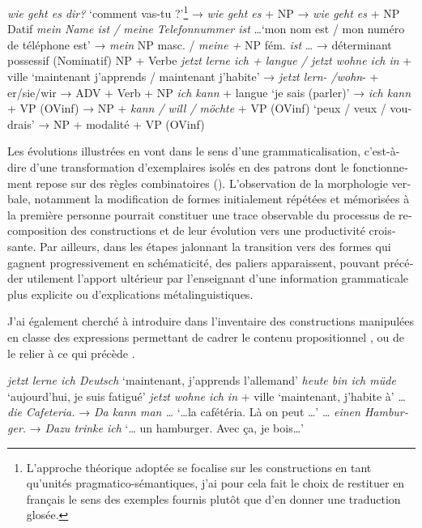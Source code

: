 \documentclass[output=paper]{langscibook}
\begin{document}
\begin{otherlanguage}{french}
\ea \label{ex:felce:1} 
     \ea \textit{wie geht es dir?} `comment vas-tu ?'\footnote{L’approche théorique adoptée se focalise sur les constructions en tant qu’unités pragmatico-sémantiques, j'ai pour cela fait le choix de restituer en français le sens des exemples fournis plutôt que d’en donner une traduction glosée.} → \textit{wie geht es} + NP → \textit{wie geht es} + NP Datif
     \ex \textit{mein Name ist / meine Telefonnummer ist} …`mon nom est / mon numéro de téléphone est' → \textit{mein} NP masc. / \textit{meine +} NP fém. \textit{ist} … →   déterminant possessif (Nominatif) NP + Verbe
     \ex \textit{jetzt lerne ich + langue / jetzt wohne ich in} + ville `maintenant j’apprends / maintenant j’habite' → \textit{jetzt lern- /wohn}- + er/sie/wir → ADV + Verb + NP
     \ex \textit{ich kann} + langue `je sais (parler)' → \textit{ich kann} + VP (OVinf) → NP + \textit{kann / will / möchte} + VP (OVinf) `peux / veux / voudrais' → NP + modalité + VP (OVinf)
     \z
\z

Les évolutions illustrées en  vont dans le sens d’une grammaticalisation, c’est-à-dire d’une transformation d’exemplaires isolés en des patrons dont le fonctionnement repose sur des règles combinatoires (\citealt[1–2]{Noyau1997}). L’observation de la morphologie verbale, notamment la modification de formes initialement répétées et mémorisées à la première personne pourrait constituer une trace observable du processus de recomposition des constructions et de leur évolution vers une productivité croissante. Par ailleurs, dans les étapes jalonnant la transition vers des formes qui gagnent progressivement en schématicité, des paliers apparaissent, pouvant précéder utilement l’apport ultérieur par l’enseignant d’une information grammaticale plus explicite ou d’explications métalinguistiques.

J'ai également cherché à introduire dans l’inventaire des constructions manipulées en classe des expressions permettant de cadrer le contenu propositionnel , ou de le relier à ce qui précède .

\ea%
    \label{ex:felce:2}
    \ea \textit{jetzt lerne ich Deutsch} `maintenant, j’apprends l’allemand'
    \ex \textit{heute bin ich müde} `aujourd’hui, je suis fatigué'
    \ex \textit{jetzt wohne ich in} + ville `maintenant, j’habite à'
    \z
\ex\label{ex:felce:3}
     \ea … \textit{die Cafeteria.} → \textit{Da kann man …} `…la cafétéria. Là on peut …'
     \ex… \textit{einen Hamburger.} → \textit{Dazu trinke ich} `… un hamburger. Avec ça, je bois…'
     \z
\z


\end{otherlanguage}
\end{document}
